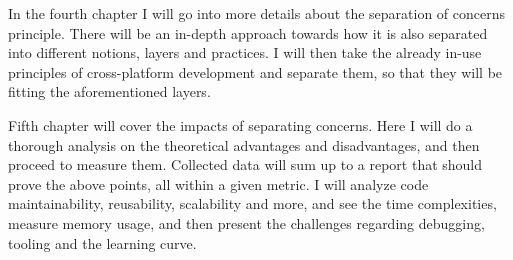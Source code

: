 In the fourth chapter I will go into more details about the separation of concerns principle.
There will be an in-depth approach towards how it is also separated into different notions, layers and practices.
I will then take the already in-use principles of cross-platform development and separate them, so that they will be fitting the aforementioned layers.
\par
Fifth chapter will cover the impacts of separating concerns.
Here I will do a thorough analysis on the theoretical advantages and disadvantages, and then proceed to measure them.
Collected data will sum up to a report that should prove the above points, all within a given metric.
I will analyze code maintainability, reusability, scalability and more, and see the time complexities, measure memory usage, and then present the challenges regarding debugging, tooling and the learning curve.

